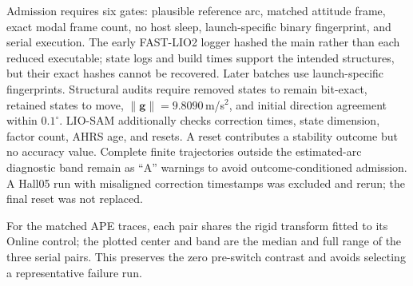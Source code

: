Admission requires six gates: plausible reference arc, matched attitude frame,
exact modal frame count, no host sleep, launch-specific binary fingerprint, and
serial execution. The early FAST-LIO2 logger hashed the main rather than each
reduced executable; state logs and build times support the intended structures,
but their exact hashes cannot be recovered. Later batches use launch-specific
fingerprints. Structural audits require removed states to remain bit-exact,
retained states to move, $\|\mathbf g\|=9.8090$\,m/s$^2$, and initial direction
agreement within $0.1^\circ$. LIO-SAM additionally checks correction times,
state dimension, factor count, AHRS age, and resets. A reset contributes a
stability outcome but no accuracy value. Complete finite trajectories outside
the estimated-arc diagnostic band remain as ``A'' warnings to avoid
outcome-conditioned admission. A Hall05 run with misaligned correction
timestamps was excluded and rerun; the final reset was not replaced.

For the matched APE traces, each pair shares the rigid transform fitted to its
Online control; the plotted center and band are the median and full range of
the three serial pairs. This preserves the zero pre-switch contrast and avoids
selecting a representative failure run.
